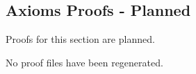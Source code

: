 \subsection*{Axioms Proofs - Planned}

\begin{remark*}
Proofs for this section are planned.
\end{remark*}

\begin{remark*}
No proof files have been regenerated.
\end{remark*}
